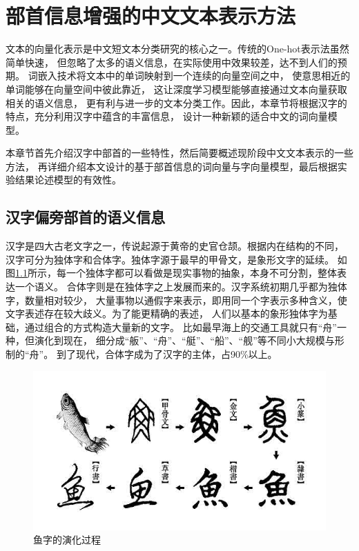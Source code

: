 \documentclass{standalone}
\begin{document}
\chapter{部首信息增强的中文文本表示方法}
\label{3_section}
文本的向量化表示是中文短文本分类研究的核心之一。传统的One-hot表示法虽然简单快速，
但忽略了太多的语义信息，在实际使用中效果较差，达不到人们的预期。
词嵌入技术将文本中的单词映射到一个连续的向量空间之中，
使意思相近的单词能够在向量空间中彼此靠近，
这让深度学习模型能够直接通过文本向量获取相关的语义信息，
更有利与进一步的文本分类工作。因此，本章节将根据汉字的特点，充分利用汉字中蕴含的丰富信息，
设计一种新颖的适合中文的词向量模型。

本章节首先介绍汉字中部首的一些特性，然后简要概述现阶段中文文本表示的一些方法，
再详细介绍本文设计的基于部首信息的词向量与字向量模型，最后根据实验结果论述模型的有效性。
\section{汉字偏旁部首的语义信息}
\label{radical_information}
汉字是四大古老文字之一，传说起源于黄帝的史官仓颉。根据内在结构的不同，
汉字可分为独体字和合体字。独体字源于最早的甲骨文，是象形文字的延续。
如图\ref{char_fish}所示，每一个独体字都可以看做是现实事物的抽象，本身不可分割，整体表达一个语义。
合体字则是在独体字之上发展而来的。汉字系统初期几乎都为独体字，数量相对较少，
大量事物以通假字来表示，即用同一个字表示多种含义，使文字表述存在较大歧义。为了能更精确的表述，
人们以基本的象形独体字为基础，通过组合的方式构造大量新的文字。
比如最早海上的交通工具就只有“舟”一种，但演化到现在，
细分成“舨”、“舟”、“艇”、“船”、“舰”等不同小大规模与形制的“舟”。
到了现代，合体字成为了汉字的主体，占90\%以上。
\begin{figure}[h]
    \includegraphics[scale=0.6]{picture/char.png}
    \caption{鱼字的演化过程}
    \label{char_fish}
\end{figure}
\end{document}
